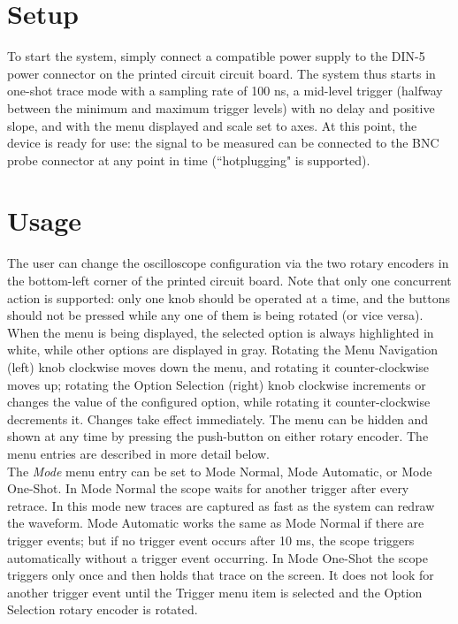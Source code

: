 \documentclass[titlepage]{scrartcl}
\begin{document}
	\section{Setup}
	To start the system, simply connect a compatible power supply to the DIN-5 power connector on the printed circuit circuit board. The system thus starts in one-shot trace mode with a sampling rate of 100 ns, a mid-level trigger (halfway between the minimum and maximum trigger levels) with no delay and positive slope, and with the menu displayed and scale set to axes. At this point, the device is ready for use: the signal to be measured can be connected to the BNC probe connector at any point in time (``hotplugging" is supported).
	
	\section{Usage}
	The user can change the oscilloscope configuration via the two rotary encoders in the bottom-left corner of the printed circuit board. Note that only one concurrent action is supported: only one knob should be operated at a time, and the buttons should not be pressed while any one of them is being rotated (or vice versa).\\

When the menu is being displayed, the selected option is always highlighted in white, while other options are displayed in gray. Rotating the Menu Navigation (left) knob clockwise moves down the menu, and rotating it counter-clockwise moves up; rotating the Option Selection (right) knob clockwise increments or changes the value of the configured option, while rotating it counter-clockwise decrements it. Changes take effect immediately. The menu can be hidden and shown at any time by pressing the push-button on either rotary encoder. The menu entries are described in more detail below.\\

The \textit{Mode} menu entry can be set to Mode Normal, Mode Automatic, or Mode One-Shot. In Mode Normal the scope waits for another trigger after every retrace. In this mode new traces are captured as fast as the system can redraw the waveform. Mode Automatic works the same as Mode Normal if there are trigger events; but if no trigger event occurs after 10 ms, the scope triggers automatically without a trigger event occurring. In Mode One-Shot the scope triggers only once and then holds that trace on the screen. It does not look for another trigger event until the Trigger menu item is selected and the Option Selection rotary encoder is rotated.\\
\end{document}
